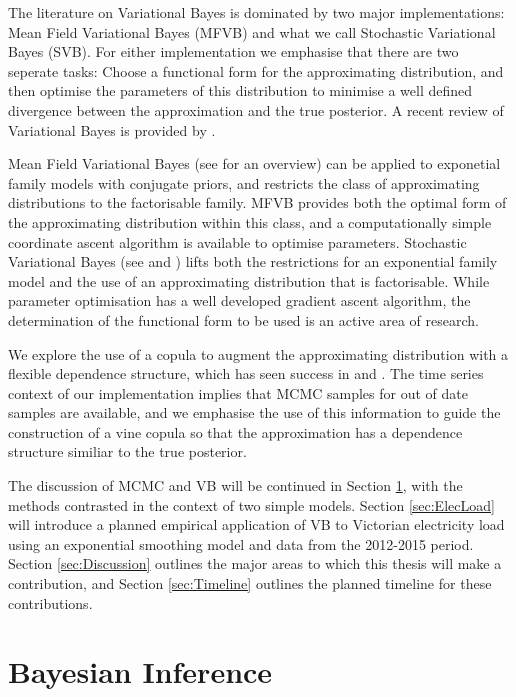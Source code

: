 \documentclass[12pt,a4paper]{article}%
\numberwithin{equation}{section}
\begin{document}
The literature on Variational Bayes is dominated by two major implementations: Mean Field Variational Bayes (MFVB) and what we call Stochastic Variational Bayes (SVB). For either implementation we emphasise that there are two seperate tasks: Choose a functional form for the approximating distribution, and then optimise the parameters of this distribution to minimise a well defined divergence between the approximation and the true posterior. A recent review of Variational Bayes is provided by \citet{Blei2017}.

Mean Field Variational Bayes (see \citet{Bishop2006} for an overview) can be applied to exponetial family models with conjugate priors, and restricts the class of approximating distributions to the factorisable family. MFVB provides both the optimal form of the approximating distribution within this class, and a computationally simple coordinate ascent algorithm is available to optimise parameters.
Stochastic Variational Bayes (see \citet{Paisley2012} and \citet{Ranganath2014}) lifts both the restrictions for an exponential family model and the use of an approximating distribution that is factorisable. While parameter optimisation has a well developed gradient ascent algorithm, the determination of the functional form to be used is an active area of research.

We explore the use of a copula to augment the approximating distribution with a flexible dependence structure, which has seen success in \citet{Tran2015} and \citet{Ng2016}. The time series context of our implementation implies that MCMC samples for out of date samples are available, and we emphasise the use of this information to guide the construction of a vine copula so that the approximation has a dependence structure similiar to the true posterior. 

The discussion of MCMC and VB will be continued in Section \ref{sec:BayesInf}, with the methods contrasted in the context of two simple models. Section \ref{sec:ElecLoad} will introduce a planned empirical application of VB to Victorian electricity load using an exponential smoothing model and data from the 2012-2015 period. Section \ref{sec:Discussion} outlines the major areas to which this thesis will make a contribution, and Section \ref{sec:Timeline} outlines the planned timeline for these contributions.

\section{Bayesian Inference} \label{sec:BayesInf}
\end{document}
